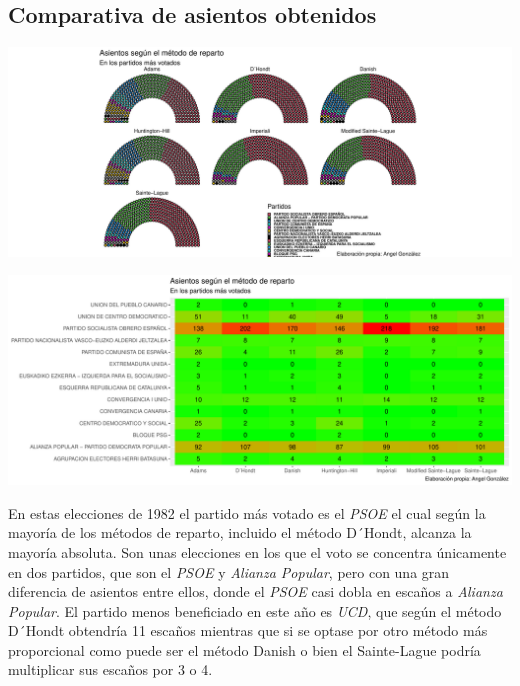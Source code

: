 \documentclass[12pt,a4paper,]{book}
\numberwithin{dummy}{section}
\theoremstyle{ocrenumbox}
\theoremstyle{blacknumex}
\theoremstyle{blacknumbox}
\theoremstyle{ocrenum}
\theoremstyle{ocrenum}
\begin{document}
\hypertarget{comparativa-de-asientos-obtenidos-2}{%
\subsection{Comparativa de asientos
obtenidos}\label{comparativa-de-asientos-obtenidos-2}}

\begin{center}\includegraphics[width=1\linewidth]{figurasR/unnamed-chunk-79-1} \end{center}

\begin{center}\includegraphics[width=1\linewidth]{figurasR/unnamed-chunk-79-2} \end{center}

En estas elecciones de 1982 el partido más votado es el \emph{PSOE} el
cual según la mayoría de los métodos de reparto, incluido el método
D´Hondt, alcanza la mayoría absoluta. Son unas elecciones en los que el
voto se concentra únicamente en dos partidos, que son el \emph{PSOE} y
\emph{Alianza Popular}, pero con una gran diferencia de asientos entre
ellos, donde el \emph{PSOE} casi dobla en escaños a \emph{Alianza
Popular}. El partido menos beneficiado en este año es \emph{UCD}, que
según el método D´Hondt obtendría 11 escaños mientras que si se optase
por otro método más proporcional como puede ser el método Danish o bien
el Sainte-Lague podría multiplicar sus escaños por 3 o 4.
\end{document}
